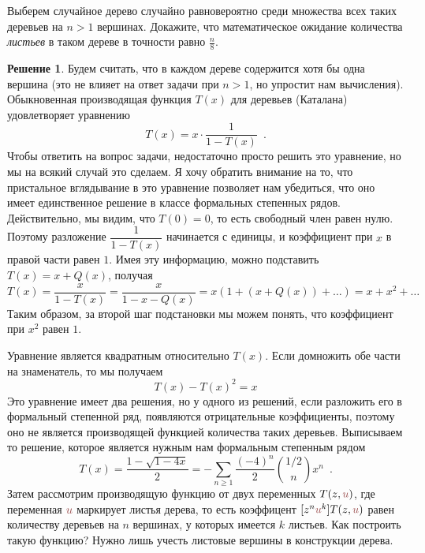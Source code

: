 \documentclass[a5paper]{article}
\theoremstyle{definition}
\newtheorem*{solution}{Решение}
\begin{document}
Выберем случайное дерево случайно равновероятно среди множества всех таких
деревьев на \( n > 1 \) вершинах. Докажите, что математическое ожидание количества
\emph{листьев} в таком дереве в точности равно \( \frac{n}{8} \).
\begin{solution}
Будем считать, что в каждом дереве содержится хотя бы одна вершина (это не
влияет на ответ задачи при \( n > 1 \), но упростит нам вычисления).
Обыкновенная производящая функция \( T(x) \) для деревьев (Каталана)
удовлетворяет уравнению
\begin{equation}
    T(x) = x \cdot \dfrac{1}{1- T(x)}
    \enspace .
\end{equation}
Чтобы ответить на вопрос задачи, недостаточно просто решить это уравнение, но мы
на всякий случай это сделаем. Я хочу обратить внимание на то, что пристальное
вглядывание в это уравнение позволяет нам убедиться, что оно имеет единственное
решение в классе формальных степенных рядов. Действительно, мы видим, что \( T(0) =
0 \), то есть свободный член равен нулю. Поэтому разложение \( \dfrac{1}{1 -
  T(x)} \) начинается с единицы, и коэффициент при \( x \) в правой части равен
\( 1 \). Имея эту информацию, можно подставить \( T(x) = x + Q(x) \), получая
\begin{equation}
   T(x) = \dfrac{x}{1 - T(x)} = \dfrac{x}{1 - x - Q(x)} = 
    x (1 + (x + Q(x)) + \ldots) = x + x^2 + \ldots
\end{equation}
Таким образом, за второй шаг подстановки мы можем понять, что коэффициент при \(
x^2 \) равен \( 1 \). 

Уравнение является квадратным относительно \( T(x) \).
Если домножить обе части на знаменатель, то мы получаем
\begin{equation}
    T(x) - T(x)^2 = x
\end{equation}
Это уравнение имеет два решения, но у одного из решений, если разложить его в
формальный степенной ряд, появляются отрицательные коэффициенты, поэтому оно не
является производящей функцией количества таких деревьев.
Выписываем то решение, которое является  нужным нам формальным
степенным рядом
\begin{equation}
    T(x) = \dfrac{1 - \sqrt{1 - 4x}}{2} = -\sum_{n \geq 1} \dfrac{(-4)^{n}}{2} {1/2
\choose n} x^n \enspace .
\end{equation}
\def\uu{ {\color{blackred}u} }
Затем рассмотрим производящую функцию от двух переменных \( T(z, \uu) \), 
где переменная \( \uu \) маркирует листья дерева, то есть коэффицент
\( [z^n \uu^k] T(z, \uu) \) равен количеству деревьев на \( n \) вершинах, у
которых имеется \( k \) листьев. Как построить такую функцию? Нужно лишь учесть
листовые вершины в конструкции дерева.


\end{solution}
\end{document}
